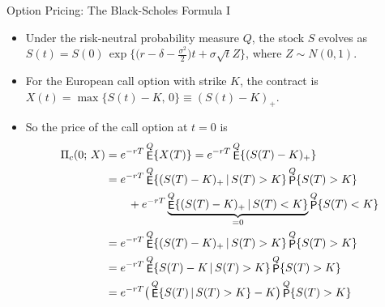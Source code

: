 \documentclass[10pt,handout]{beamer}
\DeclareMathOperator\prb{{\sf P}}
\DeclareMathOperator\expc{{\sf E}}
\theoremstyle{definition}
\begin{document}
\begin{frame}{Option Pricing: The Black-Scholes Formula I}
  \begin{itemize}
    \item Under the risk-neutral probability measure $Q$, the stock $S$ evolves as $S(t) = S(0)\,\exp\big\{\big(r - \delta - \frac{\sigma^2}{2}\big)t + \sigma\sqrt{t}Z\big\}$, where $Z\sim N(0, 1)$.
    \item For the European call option with strike $K$, the contract is $X(t) = \max\{S(t) - K,\,0\} \equiv (S(t) - K)_+$.
    \item So the price of the call option at $t = 0$ is
      \begin{align*}
        \Pi_c(0;\,X) &= e^{-rT}\expc^Q\{X(T)\} = e^{-rT}\expc^Q\{(S(T) - K)_+\} \\ 
        &= e^{-rT}\expc^Q\{(S(T) - K)_+\,|\, S(T) > K\} \prb^Q\{S(T) > K\} \\
        &\qquad+ e^{-rT}\underbrace{\expc^Q\{(S(T) - K)_+\,|\, S(T) < K\}}_{ = 0} \prb^Q\{S(T) < K\} \\
        &= e^{-rT}\expc^Q\{(S(T) - K)_+\,|\, S(T) > K\} \prb^Q\{S(T) > K\} \\
        &= e^{-rT}\expc^Q\{S(T) - K\,|\, S(T) > K\} \prb^Q\{S(T) > K\} \\ 
        &= e^{-rT}\big(\expc^Q\{S(T)\,|\, S(T) > K\} - K\big)\prb^Q\{S(T) > K\} 
      \end{align*}
  \end{itemize}
\end{frame}
\end{document}
